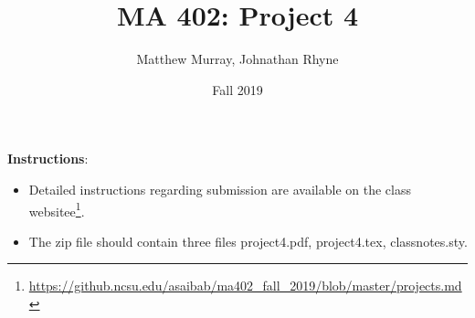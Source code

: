 \documentclass[answers,10pt]{exam}
\title{MA 402: Project 4}
\author{Matthew Murray, Johnathan Rhyne}
\date{Fall 2019}
\begin{document}
\maketitle
\textbf{Instructions}: 


\begin{itemize}
\item Detailed instructions regarding submission are available on the class websitee\footnote{\url{https://github.ncsu.edu/asaibab/ma402_fall_2019/blob/master/projects.md}}.
\item The zip file should contain three files project4.pdf, project4.tex, classnotes.sty. 

\end{itemize}

\vspace{2mm}
\end{document}
